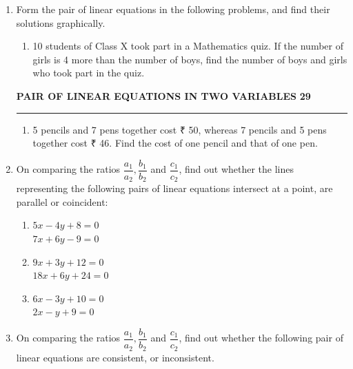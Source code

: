 \documentclass[12pt]{article}
\begin{document}
\begin{enumerate}
\item Form the pair of linear equations in the following problems, and find their solutions graphically.

\begin{enumerate}
\item 10 students of Class X took part in a Mathematics quiz. If the number of girls is 4 more than the number of boys, find the number of boys and girls who took part in the quiz.
\end{enumerate}

\newpage
\noindent
\textcolor{cyanblue}{\textbf{PAIR OF LINEAR EQUATIONS IN TWO VARIABLES}}
\hfill
\textcolor{cyanblue}{\textbf{29}}\\[-0.5em]
\textcolor{cyanblue}{\rule{\textwidth}{0.8pt}}

\noindent
\begin{enumerate}[resume]
\item 5 pencils and 7 pens together cost ₹ 50, whereas 7 pencils and 5 pens together cost ₹ 46. Find the cost of one pencil and that of one pen.
\end{enumerate}

\item On comparing the ratios \( \dfrac{a_1}{a_2}, \dfrac{b_1}{b_2} \) and \( \dfrac{c_1}{c_2} \), find out whether the lines representing the following pairs of linear equations intersect at a point, are parallel or coincident:

\begin{multicols}{2}
\begin{enumerate}[label=(\roman*)]
    \item \(5x - 4y + 8 = 0\)\\
          \(7x + 6y - 9 = 0\)

    \item \(9x + 3y + 12 = 0\)\\
          \(18x + 6y + 24 = 0\)

    \item \(6x - 3y + 10 = 0\)\\
          \(2x - y + 9 = 0\)
\end{enumerate}
\end{multicols}

\item On comparing the ratios \( \dfrac{a_1}{a_2}, \dfrac{b_1}{b_2} \) and \( \dfrac{c_1}{c_2} \), find out whether the following pair of linear equations are consistent, or inconsistent.


\end{enumerate}
\end{document}
